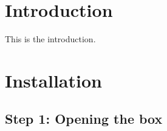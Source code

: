 \hypertarget{index_intro_sec}{}\section{Introduction}\label{index_intro_sec}
This is the introduction.\hypertarget{index_install_sec}{}\section{Installation}\label{index_install_sec}
\hypertarget{index_step1}{}\subsection{Step 1\+: Opening the box}\label{index_step1}
